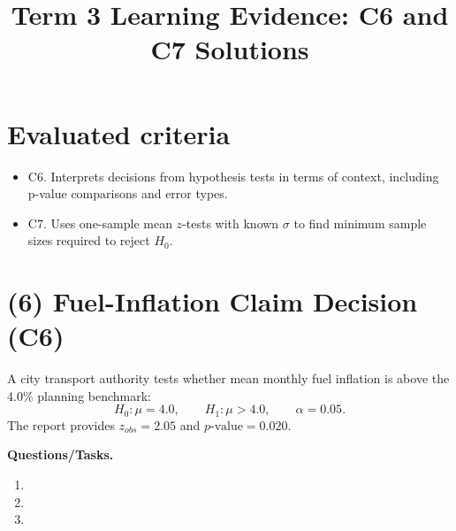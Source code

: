 \makeatletter
{}
\makeatother



\title{Term 3 Learning Evidence: C6 and C7 Solutions}
\author{}
\date{}


\maketitle

\setcounter{tocdepth}{1}
\setcounter{secnumdepth}{2}
\label{toc}
\tableofcontents

\section*{Evaluated criteria}
\begin{itemize}
    \item C6. Interprets decisions from hypothesis tests in terms of context, including p-value comparisons and error types.
    \item C7. Uses one-sample mean \(z\)-tests with known \(\sigma\) to find minimum sample sizes required to reject \(H_0\).
\end{itemize}

\section{(6) Fuel-Inflation Claim Decision (C6)}
\label{sec:fuel-inflation-claim-decision-c6}
A city transport authority tests whether mean monthly fuel inflation is above the 4.0\% planning benchmark:
\[
H_0:\mu=4.0,\qquad H_1:\mu>4.0,\qquad \alpha=0.05.
\]
The report provides \(z_{obs}=2.05\) and \(p\text{-value}=0.020\).

\textbf{Questions/Tasks.}
\begin{enumerate}[label=\textbf{\alph*)}]
    \item {}
    \item {}
    \item {}
\end{enumerate}


